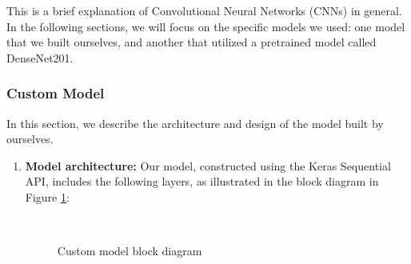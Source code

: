 This is a brief explanation of Convolutional Neural Networks (CNNs) in general. In the following sections, we will focus on the specific models we used: one model that we built ourselves, and another that utilized a pretrained model called DenseNet201.

\subsubsection{Custom Model}
In this section, we describe the architecture and design of the model built by ourselves. 
\begin{enumerate}
    \item \textbf{Model architecture:} Our model, constructed using the Keras Sequential API, includes the following layers, as illustrated in the block diagram in Figure \ref{fig:custom model}:

\begin{figure}[!ht]
\centering
{}\hfill
{}\\
\hfill
{}
\caption{Custom model block diagram}
\label{fig:custom model}
\end{figure}



\end{enumerate}
